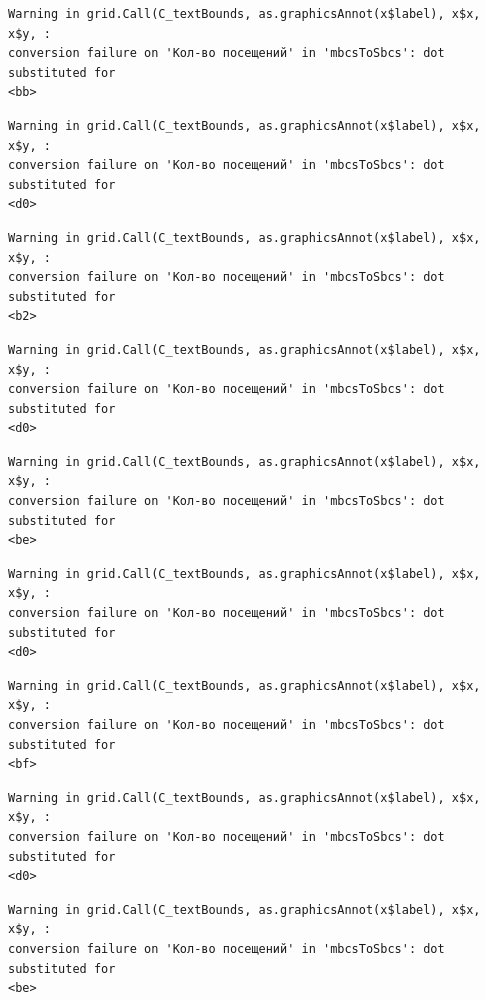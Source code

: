 \documentclass[
  letterpaper,
  DIV=11,
  numbers=noendperiod]{scrartcl}
\begin{document}
\begin{verbatim}
Warning in grid.Call(C_textBounds, as.graphicsAnnot(x$label), x$x, x$y, :
conversion failure on 'Кол-во посещений' in 'mbcsToSbcs': dot substituted for
<bb>
\end{verbatim}

\begin{verbatim}
Warning in grid.Call(C_textBounds, as.graphicsAnnot(x$label), x$x, x$y, :
conversion failure on 'Кол-во посещений' in 'mbcsToSbcs': dot substituted for
<d0>
\end{verbatim}

\begin{verbatim}
Warning in grid.Call(C_textBounds, as.graphicsAnnot(x$label), x$x, x$y, :
conversion failure on 'Кол-во посещений' in 'mbcsToSbcs': dot substituted for
<b2>
\end{verbatim}

\begin{verbatim}
Warning in grid.Call(C_textBounds, as.graphicsAnnot(x$label), x$x, x$y, :
conversion failure on 'Кол-во посещений' in 'mbcsToSbcs': dot substituted for
<d0>
\end{verbatim}

\begin{verbatim}
Warning in grid.Call(C_textBounds, as.graphicsAnnot(x$label), x$x, x$y, :
conversion failure on 'Кол-во посещений' in 'mbcsToSbcs': dot substituted for
<be>
\end{verbatim}

\begin{verbatim}
Warning in grid.Call(C_textBounds, as.graphicsAnnot(x$label), x$x, x$y, :
conversion failure on 'Кол-во посещений' in 'mbcsToSbcs': dot substituted for
<d0>
\end{verbatim}

\begin{verbatim}
Warning in grid.Call(C_textBounds, as.graphicsAnnot(x$label), x$x, x$y, :
conversion failure on 'Кол-во посещений' in 'mbcsToSbcs': dot substituted for
<bf>
\end{verbatim}

\begin{verbatim}
Warning in grid.Call(C_textBounds, as.graphicsAnnot(x$label), x$x, x$y, :
conversion failure on 'Кол-во посещений' in 'mbcsToSbcs': dot substituted for
<d0>
\end{verbatim}

\begin{verbatim}
Warning in grid.Call(C_textBounds, as.graphicsAnnot(x$label), x$x, x$y, :
conversion failure on 'Кол-во посещений' in 'mbcsToSbcs': dot substituted for
<be>
\end{verbatim}
\end{document}
